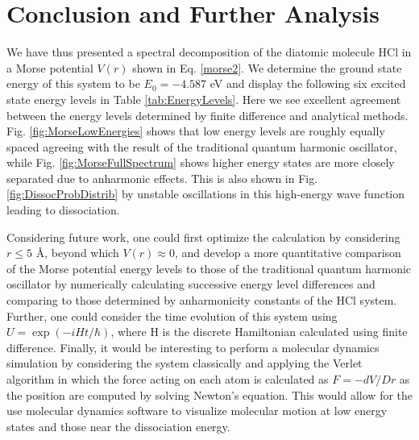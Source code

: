 \documentclass[%
aps, %
prl, %
preprint, %
12pt, %
amsfonts, %
amssymb, %
amsmath, %
endfloats,%
raggedbottom, %
]{revtex4-1}
\begin{document}
\section{\label{sec:Conclusion_Future_Work}Conclusion and Further Analysis}
We have thus presented a spectral decomposition of the diatomic molecule HCl in a Morse potential
$V(r)$ shown in Eq. \ref{morse2}. We determine the ground state energy of this system to be
$E_0 = -4.587$ eV and display the following six excited state energy levels in Table
\ref{tab:EnergyLevels}. Here we see excellent agreement between the energy levels determined by finite
difference and analytical methods. Fig. \ref{fig:MorseLowEnergies} shows that low energy levels are
roughly equally spaced agreeing with the result of the traditional quantum harmonic oscillator, while
Fig. \ref{fig:MorseFullSpectrum} shows higher energy states are more closely separated due to
anharmonic effects. This is also shown in Fig. \ref{fig:DissocProbDistrib} by unstable oscillations in
this high-energy wave function leading to dissociation.

Considering future work, one could first optimize the calculation by considering $r \leq 5$ Å, beyond
which $V(r) \approx 0$, and develop a more quantitative comparison of the Morse potential energy levels
to those of the traditional quantum harmonic oscillator by numerically calculating successive energy
level differences and comparing to those determined by anharmonicity constants of the HCl system.
Further, one could consider the time evolution of this system using $U = \exp{(-iHt/\hbar)}$, where H
is the discrete Hamiltonian calculated using finite difference. Finally, it would be interesting to
perform a molecular dynamics simulation by considering the system classically and applying the Verlet
algorithm in which the force acting on each atom is calculated as $F = -dV/Dr$ as the position are
computed by solving Newton's equation. This would allow for the use molecular dynamics software to
visualize molecular motion at low energy states and those near the dissociation energy.
\end{document}
